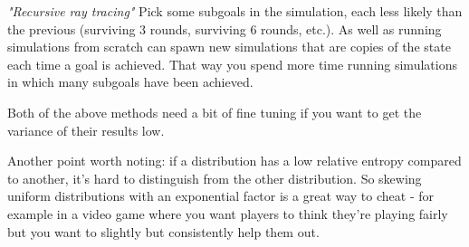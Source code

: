 \documentclass[12pt]{article}
\begin{document}
\emph{"Recursive ray tracing"} Pick some subgoals in the simulation, each less likely than the previous (surviving 3 rounds, surviving 6 rounds, etc.). As well as running simulations from scratch can spawn new simulations that are copies of the state each time a goal is achieved. That way you spend more time running simulations in which many subgoals have been achieved.

Both of the above methods need a bit of fine tuning if you want to get the variance of their results low.

Another point worth noting: if a distribution has a low relative entropy compared to another, it's hard to distinguish from the other distribution.
So skewing uniform distributions with an exponential factor is a great way to cheat - for example in a video game where you want players to think they're playing fairly but you want to slightly but consistently help them out.
\end{document}
